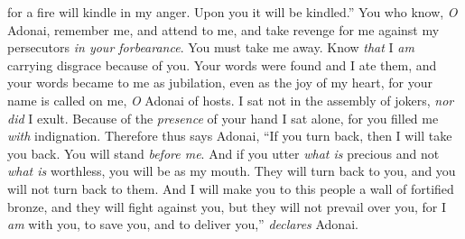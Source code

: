 \begin{biblechapter}
for a fire will kindle in my anger. 
Upon you it will be kindled.”
\verse You who know, \textit{O} Adonai, remember me, and attend to me, 
and take revenge for me against my persecutors \textit{in your forbearance}. 
You must take me away. 
Know \textit{that} I \textit{am} carrying disgrace because of you.
\verse Your words were found and I ate them, 
and your words became to me as jubilation, 
even as the joy of my heart, 
for your name is called on me, \textit{O} Adonai of hosts.
\verse I sat not in the assembly of jokers, 
\textit{nor did} I exult. 
Because of the \textit{presence} of your hand I sat alone, 
for you filled me \textit{with} indignation.
\verse Therefore thus says Adonai,
\verse “If you turn back, then I will take you back. 
You will stand \textit{before me}. 
And if you utter \textit{what is} precious and not \textit{what is} worthless, 
you will be as my mouth. 
They will turn back to you, 
and you will not turn back to them.
\verse And I will make you to this people 
a wall of fortified bronze, 
and they will fight against you, 
but they will not prevail over you, 
for I \textit{am} with you, to save you, 
and to deliver you,” \textit{declares} Adonai.
\end{biblechapter}

